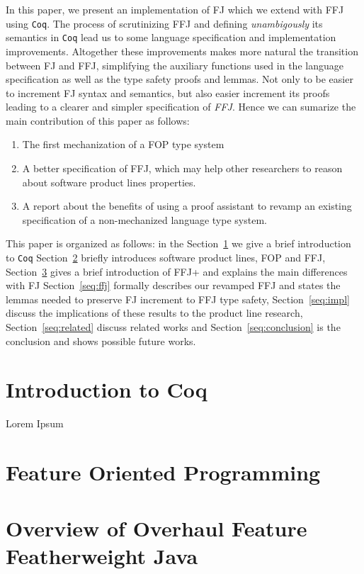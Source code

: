 \documentclass[runningheads,a4paper]{doc/llncs}
\begin{document}
In this paper, we present an implementation of \ac{FJ} which we extend with \ac{FFJ} using \texttt{Coq}.
The process of scrutinizing \ac{FFJ} and defining \textit{unambigously} its semantics in \texttt{Coq} lead us to some language specification and implementation improvements. 
Altogether these improvements makes more natural the transition between \ac{FJ} and \ac{FFJ}, simplifying the auxiliary functions used in the language specification as well as the type safety proofs and lemmas. 
Not only to be easier to increment \ac{FJ} syntax and semantics, but also easier increment its proofs leading to a clearer and simpler specification of \textit{FFJ}.
Hence we can sumarize the main contribution of this paper as follows:
\begin{enumerate}
    \item The first mechanization of a FOP type system
    \item A better specification of FFJ, which may help other researchers to reason about software product lines properties.
    \item A report about the benefits of using a proof assistant 
    to revamp an existing specification of a non-mechanized language type system.
\end{enumerate}

This paper is organized as follows: in the Section~\ref{seq:coq} we give a brief introduction to \texttt{Coq} 
Section~\ref{seq:fop} briefly introduces software product lines, \ac{FOP} and \ac{FFJ},
Section~\ref{seq:offj} gives a brief introduction of  \ac{FFJ+} and explains the main differences with \ac{FJ}
Section~\ref{seq:ffj} formally describes our revamped \ac{FFJ} and states the lemmas needed to preserve \ac{FJ} increment to \ac{FFJ} type safety, 
Section~\ref{seq:impl} discuss the implications of these results to the product line research,
Section~\ref{seq:related} discuss related works and
Section~\ref{seq:conclusion} is the conclusion and shows possible future works.

\section{Introduction to Coq}\label{seq:coq}
Lorem Ipsum

\section{Feature Oriented Programming}\label{seq:fop}

\section{Overview of Overhaul Feature Featherweight Java}\label{seq:offj}

\end{document}
